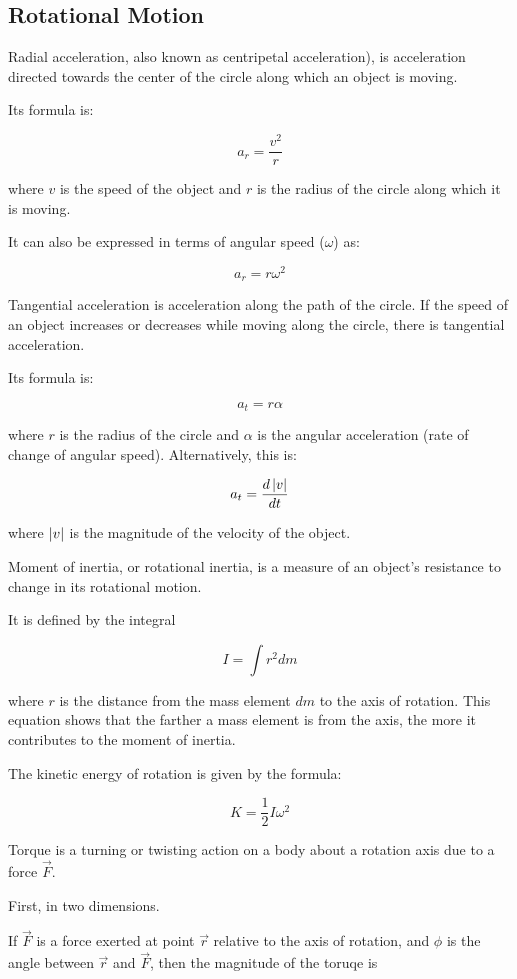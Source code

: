 \documentclass{article}
\begin{document}
\subsection{Rotational Motion}

Radial acceleration, also known as centripetal acceleration), is acceleration directed towards the center of the circle along which an object is moving.

Its formula is:

\[ a_r = \frac{v^2}{r} \]

where $v$ is the speed of the object and $r$ is the radius of the circle along which it is moving.

It can also be expressed in terms of angular speed ($\omega$) as:

\[ a_r = r \omega^2 \]

Tangential acceleration is acceleration along the path of the circle. If the speed of an object increases or decreases while moving along the circle, there is tangential acceleration.

Its formula is:

\[ a_t = r \alpha \]

where $r$ is the radius of the circle and $\alpha$ is the angular acceleration (rate of change of angular speed). Alternatively, this is:

\[ a_t = \frac{d\left| v \right|}{dt} \]

where $\left| v \right|$ is the magnitude of the velocity of the object.

Moment of inertia, or rotational inertia, is a measure of an object's resistance to change in its rotational motion.

It is defined by the integral

\[ I = \int r^2 dm \]

where $r$ is the distance from the mass element $dm$ to the axis of rotation. This equation shows that the farther a mass element is from the axis, the more it contributes to the moment of inertia.

The kinetic energy of rotation is given by the formula:

\[ K = \frac{1}{2} I \omega^2 \]

Torque is a turning or twisting action on a body about a rotation axis due to a force $\vec{F}$.

First, in two dimensions.

If $\vec{F}$ is a force exerted at point $\vec{r}$ relative to the axis of rotation, and $\phi$ is the angle between $\vec{r}$ and $\vec{F}$, then the magnitude of the toruqe is
\end{document}
